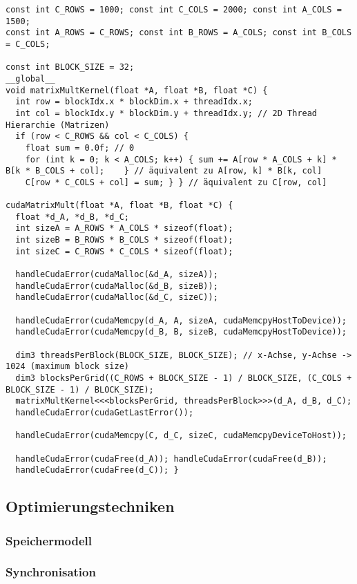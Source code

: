 \begin{lstlisting}
const int C_ROWS = 1000; const int C_COLS = 2000; const int A_COLS = 1500;
const int A_ROWS = C_ROWS; const int B_ROWS = A_COLS; const int B_COLS = C_COLS;

const int BLOCK_SIZE = 32;
__global__
void matrixMultKernel(float *A, float *B, float *C) {
  int row = blockIdx.x * blockDim.x + threadIdx.x;
  int col = blockIdx.y * blockDim.y + threadIdx.y; // 2D Thread Hierarchie (Matrizen)
  if (row < C_ROWS && col < C_COLS) {
  	float sum = 0.0f; // 0
  	for (int k = 0; k < A_COLS; k++) { sum += A[row * A_COLS + k] * B[k * B_COLS + col];    } // äquivalent zu A[row, k] * B[k, col]
  	C[row * C_COLS + col] = sum; } } // äquivalent zu C[row, col]

cudaMatrixMult(float *A, float *B, float *C) {
  float *d_A, *d_B, *d_C;
  int sizeA = A_ROWS * A_COLS * sizeof(float);
  int sizeB = B_ROWS * B_COLS * sizeof(float);
  int sizeC = C_ROWS * C_COLS * sizeof(float);

  handleCudaError(cudaMalloc(&d_A, sizeA));
  handleCudaError(cudaMalloc(&d_B, sizeB));
  handleCudaError(cudaMalloc(&d_C, sizeC));

  handleCudaError(cudaMemcpy(d_A, A, sizeA, cudaMemcpyHostToDevice));
  handleCudaError(cudaMemcpy(d_B, B, sizeB, cudaMemcpyHostToDevice));

  dim3 threadsPerBlock(BLOCK_SIZE, BLOCK_SIZE); // x-Achse, y-Achse -> 1024 (maximum block size)
  dim3 blocksPerGrid((C_ROWS + BLOCK_SIZE - 1) / BLOCK_SIZE, (C_COLS + BLOCK_SIZE - 1) / BLOCK_SIZE);
  matrixMultKernel<<<blocksPerGrid, threadsPerBlock>>>(d_A, d_B, d_C);
  handleCudaError(cudaGetLastError());

  handleCudaError(cudaMemcpy(C, d_C, sizeC, cudaMemcpyDeviceToHost));

  handleCudaError(cudaFree(d_A)); handleCudaError(cudaFree(d_B));
  handleCudaError(cudaFree(d_C)); }
\end{lstlisting}

\subsection{Optimierungstechniken}

\subsubsection{Speichermodell}



\subsubsection{Synchronisation}


